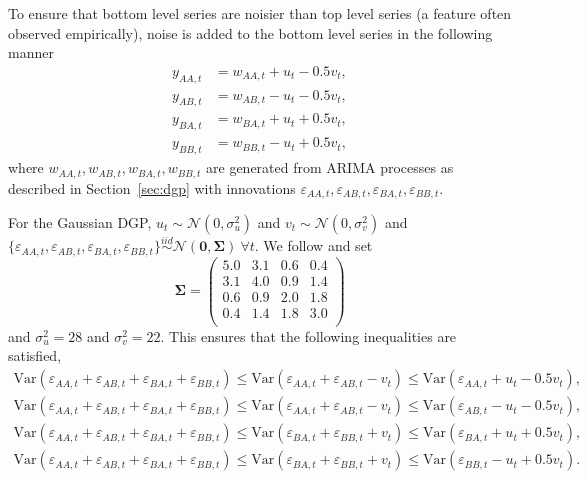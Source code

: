 \documentclass[12pt]{article}
\def\var{\text{Var}}
\theoremstyle{definition}
\begin{document}
To ensure that bottom level series are noisier than top level series (a feature often observed empirically), noise is added to the bottom level series in the following manner
\begin{align*}
y_{AA,t} &= w_{AA,t} + u_t - 0.5v_t,\\
y_{AB,t} &= w_{AB,t} - u_t - 0.5v_t,\\
y_{BA,t} &= w_{BA,t} + u_t + 0.5v_t,\\
y_{BB,t} &= w_{BB,t} - u_t + 0.5v_t,
\end{align*}
where $w_{AA,t},w_{AB,t},w_{BA,t},w_{BB,t}$ are generated from ARIMA processes as described in Section~\ref{sec:dgp} with innovations $\varepsilon_{AA,t},\varepsilon_{AB,t},\varepsilon_{BA,t},\varepsilon_{BB,t}$. %


For the Gaussian DGP, $u_t \sim \mathcal{N}(0,\sigma^2_u)$ and $v_t \sim \mathcal{N}(0,\sigma^2_v)$ and  $\{\varepsilon_{AA,t},\varepsilon_{AB,t},\varepsilon_{BA,t},\varepsilon_{BB,t}\} \overset{iid}{\sim} \mathcal{N}(\bm{0}, \bm{\Sigma})~\forall t$.  We follow \cite{WicEtAl2019} and set
\begin{equation*}\label{eq:SigmaGaussian}
\bm{\Sigma} =
\begin{pmatrix}
5.0 & 3.1 & 0.6 & 0.4 \\
3.1 & 4.0 & 0.9 & 1.4 \\
0.6 & 0.9 & 2.0 & 1.8 \\
0.4 & 1.4 & 1.8 & 3.0 \\
\end{pmatrix}
\end{equation*} and $\sigma^2_u=28$ and $\sigma^2_v=22$. This ensures that the following inequalities are satisfied,
\begin{align*}
\var(\varepsilon_{AA,t} + \varepsilon_{AB,t} + \varepsilon_{BA,t} + \varepsilon_{BB,t})
\le \var(\varepsilon_{AA,t}+\varepsilon_{AB,t}-v_t)
\le \var(\varepsilon_{AA,t}+u_t-0.5v_t),\\
\var(\varepsilon_{AA,t} + \varepsilon_{AB,t} + \varepsilon_{BA,t} + \varepsilon_{BB,t})
\le \var(\varepsilon_{AA,t}+\varepsilon_{AB,t}-v_t)
\le \var(\varepsilon_{AB,t}-u_t-0.5v_t),\\
\var(\varepsilon_{AA,t} + \varepsilon_{AB,t} + \varepsilon_{BA,t} + \varepsilon_{BB,t})
\le \var(\varepsilon_{BA,t}+\varepsilon_{BB,t}+v_t)
\le \var(\varepsilon_{BA,t}+u_t+0.5v_t),\\
\var(\varepsilon_{AA,t} + \varepsilon_{AB,t} + \varepsilon_{BA,t} + \varepsilon_{BB,t})
\le \var(\varepsilon_{BA,t}+\varepsilon_{BB,t}+v_t)
\le \var(\varepsilon_{BB,t}-u_t+0.5v_t).\\
\end{align*}
\end{document}
